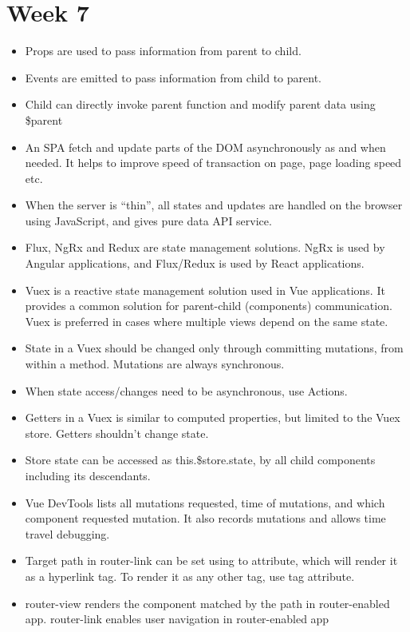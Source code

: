 \documentclass[a4paper]{article}
\begin{document}
\section{Week 7}
\begin{itemize}
    \item Props are used to pass information from parent to child.
    \item Events are emitted to pass information from child to parent.
    \item Child can directly invoke parent function and modify parent data using \$parent
    \item An SPA fetch and update parts of the DOM asynchronously as and when needed. It helps to improve speed of transaction on page, page loading speed etc.
    \item When the server is “thin”, all states and updates are handled on the browser using JavaScript, and gives pure data API service.
    \item Flux, NgRx and Redux are state management solutions. NgRx is used by Angular applications, and Flux/Redux is used by React applications.
    \item Vuex is a reactive  state management solution used in Vue applications. It provides a common solution for parent-child (components) communication. Vuex is preferred in cases where multiple views depend on the same state.
    \item State in a Vuex  should be changed only through committing mutations, from within a method. Mutations  are always synchronous.
    \item When state access/changes  need to be asynchronous, use Actions.
    \item Getters  in a Vuex  is similar to computed properties, but limited to the Vuex store. Getters shouldn’t change state. 
    \item Store state can be accessed as this.\$store.state, by all child components including its descendants.
    \item Vue DevTools lists all mutations requested, time of mutations, and which component requested mutation. It also records mutations and allows time travel debugging.
    \item Target path in router-link can be set using to attribute, which will render it as a hyperlink tag. To render it as any other tag, use tag attribute.
    \item router-view renders the component matched by the path in router-enabled app. router-link enables user navigation in router-enabled app

\end{itemize}
\end{document}
